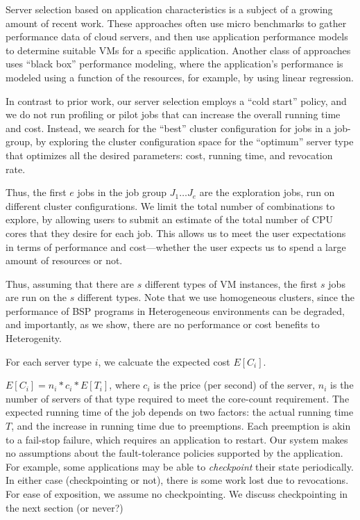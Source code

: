Server selection based on application characteristics is a subject of a growing amount of recent work.
These approaches often use micro benchmarks to gather performance data of cloud servers, and then use application performance models to determine suitable VMs for a specific application.
Another class of approaches uses ``black box'' performance modeling, where the application's performance is modeled using a function of the resources, for example, by using linear regression.

In contrast to prior work, our server selection employs a ``cold start'' policy, and we do not run profiling or pilot jobs that can increase the overall running time and cost.
Instead, we search for the ``best'' cluster configuration for jobs in a job-group, by exploring the cluster configuration space for the ``optimum'' server type that optimizes all the desired parameters: cost, running time, and revocation rate.


Thus, the first $e$ jobs in the job group $J_1\ldots J_e$ are the exploration jobs, run on different cluster configurations.
We limit the total number of combinations to explore, by allowing users to submit an estimate of the total number of CPU cores that they desire for each job.
This allows us to meet the user expectations in terms of performance and cost---whether the user expects us to spend a large amount of resources or not.

Thus, assuming that there are $s$ different types of VM instances, the first $s$ jobs are run on the $s$ different types.
Note that we use homogeneous clusters, since the performance of BSP programs in Heterogeneous environments can be degraded, and importantly, as we show, there are no performance or cost benefits to Heterogenity. 


For each server type $i$, we calcuate the expected cost $E[C_i]$.

$E[C_i] = n_i*c_i * E[T_i]$, where $c_i$ is the price (per second) of the server, $n_i$ is the number of servers of that type required to meet the core-count requirement.
The expected running time of the job depends on two factors: the actual running time $T$, and the increase in running time due to preemptions.
Each preemption is akin to a fail-stop failure, which requires an application to restart.
Our system makes no assumptions about the fault-tolerance policies supported by the application. For example, some applications may be able to \emph{checkpoint} their state periodically.
In either case (checkpointing or not), there is some work lost due to revocations.
For ease of exposition, we assume no checkpointing. We discuss checkpointing in the next section (or never?)


